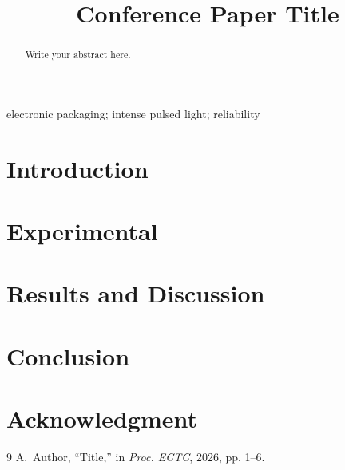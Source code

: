 \documentclass[conference]{IEEEtran}
\begin{document}
\title{Conference Paper Title}

\author{
}

\maketitle

\begin{abstract}
Write your abstract here.
\end{abstract}

\begin{IEEEkeywords}
electronic packaging; intense pulsed light; reliability
\end{IEEEkeywords}

\section{Introduction}

\section{Experimental}

\section{Results and Discussion}

\section{Conclusion}

\section*{Acknowledgment}

\begin{thebibliography}{9}
 A.~Author, ``Title,'' in \emph{Proc. ECTC}, 2026, pp. 1--6.
\end{thebibliography}
\end{document}
